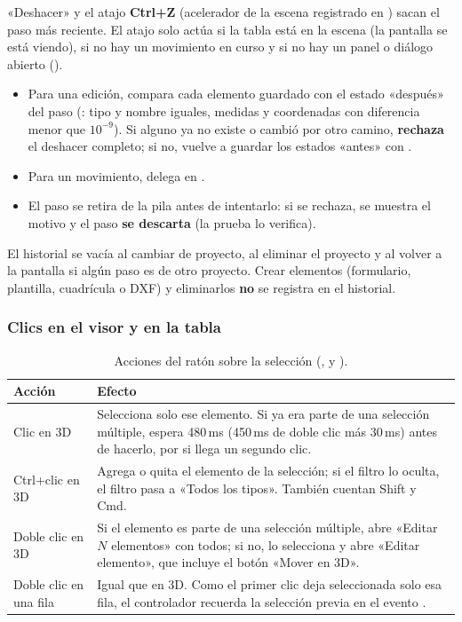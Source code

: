 «Deshacer» y el atajo \textbf{Ctrl+Z} (acelerador de la escena registrado en ) sacan el paso más
reciente. El atajo solo actúa si la tabla está en la escena (la pantalla se está viendo), si no hay un movimiento en
curso y si no hay un panel o diálogo abierto ().

\begin{itemize}
	\item Para una edición,  compara cada elemento guardado con el estado «después» del
	      paso (: tipo y nombre iguales, medidas y coordenadas con diferencia menor que
	      $10^{-9}$). Si alguno ya no existe o cambió por otro camino, \textbf{rechaza} el deshacer completo; si no,
	      vuelve a guardar los estados «antes» con .
	\item Para un movimiento, delega en .
	\item El paso se retira de la pila antes de intentarlo: si se rechaza, se muestra el motivo y el paso
	      \textbf{se descarta} (la prueba  lo verifica).
\end{itemize}

El historial se vacía al cambiar de proyecto, al eliminar el proyecto y al volver a la pantalla si algún paso es de
otro proyecto. Crear elementos (formulario, plantilla, cuadrícula o DXF) y eliminarlos \textbf{no} se registra en el
historial.

\subsubsection{Clics en el visor y en la tabla}

\begin{table}[H]
	\centering
	\caption{Acciones del ratón sobre la selección (,  y ).}
	\label{tab:mod-clics}
	\begin{tabular}{L{4.2cm}L{9.4cm}}
		\hline
		\textbf{Acción} & \textbf{Efecto} \\ \hline
		Clic en 3D & Selecciona solo ese elemento. Si ya era parte de una selección múltiple, espera 480\,ms
		(450\,ms de doble clic más 30\,ms) antes de hacerlo, por si llega un segundo clic. \\
		Ctrl+clic en 3D & Agrega o quita el elemento de la selección; si el filtro lo oculta, el filtro pasa a «Todos los
		tipos». También cuentan Shift y Cmd. \\
		Doble clic en 3D & Si el elemento es parte de una selección múltiple, abre «Editar $N$ elementos» con todos; si
		no, lo selecciona y abre «Editar elemento», que incluye el botón «Mover en 3D». \\
		Doble clic en una fila & Igual que en 3D. Como el primer clic deja seleccionada solo esa fila, el controlador
		recuerda la selección previa en el evento . \\
		\hline
	\end{tabular}
\end{table}

